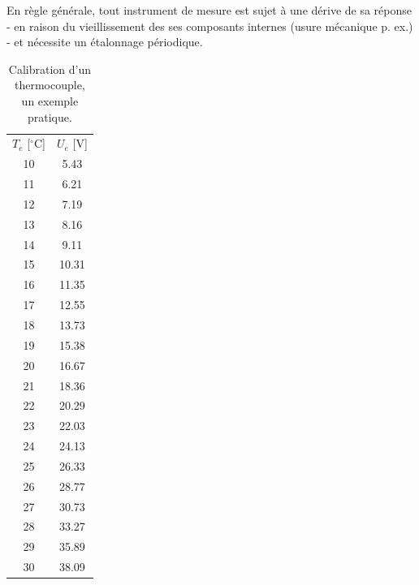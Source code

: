 En règle générale, tout instrument de mesure est sujet à une dérive de sa réponse - en raison du vieillissement des ses composants internes (usure mécanique p. ex.) -  et nécessite un étalonnage périodique.

\begin{table}
    \vspace{-1.5cm}
    \caption{Calibration d'un thermocouple, un exemple pratique.}
    \begin{center}
        \begin{tabular}{c|c}
            $T_e$ [$^\circ$C] & $U_e$ [V] \\
            10                & 5.43      \\
            11                & 6.21      \\
            12                & 7.19      \\
            13                & 8.16      \\
            14                & 9.11      \\
            15                & 10.31     \\
            16                & 11.35     \\
            17                & 12.55     \\
            18                & 13.73     \\
            19                & 15.38     \\
            20                & 16.67     \\
            21                & 18.36     \\
            22                & 20.29     \\
            23                & 22.03     \\
            24                & 24.13     \\
            25                & 26.33     \\
            26                & 28.77     \\
            27                & 30.73     \\
            28                & 33.27     \\
            29                & 35.89     \\
            30                & 38.09
        \end{tabular}
    \end{center}
    \label{tab:tc}
\end{table}

